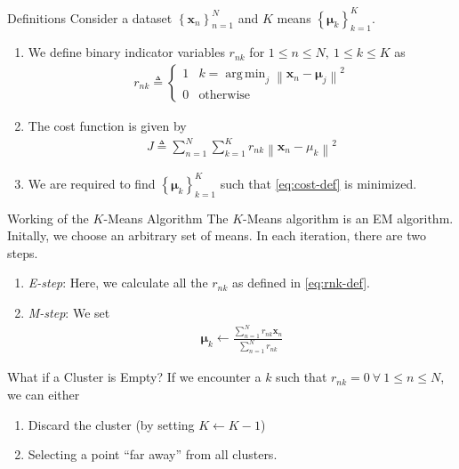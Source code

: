 \documentclass{beamer}
\DeclareMathOperator*{\argmin}{arg\,min}
\providecommand{\cbrak}[1]{\ensuremath{\left\{#1\right\}}}
\theoremstyle{remark}
\providecommand{\norm}[1]{\left\lVert#1\right\rVert}
\renewcommand{\vec}[1]{\boldsymbol{\mathbf{#1}}}
\begin{document}
\begin{frame}{Definitions}
    Consider a dataset $\cbrak{\vec{x}_n}_{n=1}^N$ and $K$ means
    $\cbrak{\vec{\mu}_k}_{k=1}^K$.
    \begin{enumerate}
        \item We define binary indicator variables $r_{nk}$ for 
        $1 \le n \le N,\ 1 \le k \le K$ as
            \begin{align}
                r_{nk} \triangleq
                \begin{cases}
                    1 & k = \argmin_j\norm{\vec{x}_n-\vec{\mu}_j}^2 \\
                    0 & \textrm{otherwise}
                \end{cases}
                \label{eq:rnk-def}
            \end{align}
        \item The cost function is given by
            \begin{align}
                J \triangleq \sum_{n=1}^N\sum_{k=1}^Kr_{nk}\norm{\vec{x}_n-\mu_{k}}^2
                \label{eq:cost-def}
            \end{align}
        \item We are required to find $\cbrak{\vec{\mu}_k}_{k=1}^K$ such that
        \eqref{eq:cost-def} is minimized.
    \end{enumerate}
\end{frame}

\begin{frame}{Working of the $K$-Means Algorithm}
    The $K$-Means algorithm is an EM algorithm. Initally, we choose an arbitrary 
    set of means. In each iteration, there are two steps.
    \begin{enumerate}
        \item \textit{E-step}: Here, we calculate all the $r_{nk}$ as defined
            in \eqref{eq:rnk-def}.
        \item \textit{M-step}: We set
            \begin{align}
                \vec{\mu}_k \leftarrow \frac{\sum_{n=1}^Nr_{nk}\vec{x}_n}{\sum_{n=1}^Nr_{nk}}
                \label{eq:M-step}
            \end{align}
    \end{enumerate}
    \begin{alertblock}{What if a Cluster is Empty?}
        If we encounter a $k$ such that $r_{nk} = 0\ \forall\ 1 \le n \le 
        N$, we can either
        \begin{enumerate}
            \item Discard the cluster (by setting $K \leftarrow K - 1$)
            \item Selecting a point ``far away'' from all clusters.
        \end{enumerate}
    \end{alertblock}
\end{frame}
\end{document}

